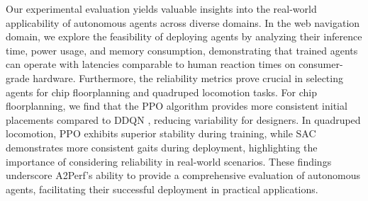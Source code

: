 Our experimental evaluation yields valuable insights into the real-world applicability of autonomous agents across diverse domains.
In the web navigation domain, we explore the feasibility of deploying agents by analyzing their inference time, power usage, and memory consumption, demonstrating that trained agents can operate with latencies comparable to human reaction times on consumer-grade hardware. Furthermore, the reliability metrics \citep{chan2019measuring} prove crucial in selecting agents for chip floorplanning and quadruped locomotion tasks.
For chip floorplanning, we find that the PPO \citep{schulman2017proximal} algorithm provides more consistent initial placements compared to DDQN \citep{van2015ddqn}, reducing variability for designers.
In quadruped locomotion, PPO exhibits superior stability during training, while SAC \citep{haarnoja2018soft_actor_critic} demonstrates more consistent gaits during deployment, highlighting the importance of considering reliability in real-world scenarios.
These findings underscore A2Perf's ability to provide a comprehensive evaluation of autonomous agents, facilitating their successful deployment in practical applications.


